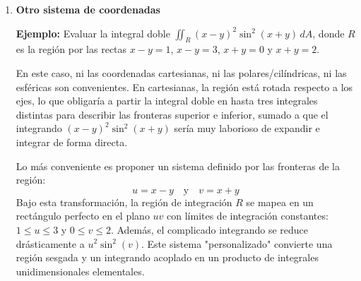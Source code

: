 \begin{respuesta}
\begin{enumerate}
    \item[(c)] \textbf{Otro sistema de coordenadas}
    
    \textbf{Ejemplo:} Evaluar la integral doble $\iint_R (x-y)^2 \sin^2(x+y) \, dA$, donde $R$ es la región por las rectas $x-y=1$, $x-y=3$, $x+y=0$ y $x+y=2$.
    
    En este caso, ni las coordenadas cartesianas, ni las polares/cilíndricas, ni las esféricas son convenientes. En cartesianas, la región está rotada respecto a los ejes, lo que obligaría a partir la integral doble en hasta tres integrales distintas para describir las fronteras superior e inferior, sumado a que el integrando $(x-y)^2 \sin^2(x+y)$ sería muy laborioso de expandir e integrar de forma directa.
    
    Lo más conveniente es proponer un sistema definido por las fronteras de la región:
    \[ u = x-y \quad \text{y} \quad v = x+y \]
    Bajo esta transformación, la región de integración $R$ se mapea en un rectángulo perfecto en el plano $uv$ con límites de integración constantes: $1 \leq u \leq 3$ y $0 \leq v \leq 2$. Además, el complicado integrando se reduce drásticamente a $u^2 \sin^2(v)$. Este sistema "personalizado" convierte una región sesgada y un integrando acoplado en un producto de integrales unidimensionales elementales.
\end{enumerate}
\end{respuesta}
